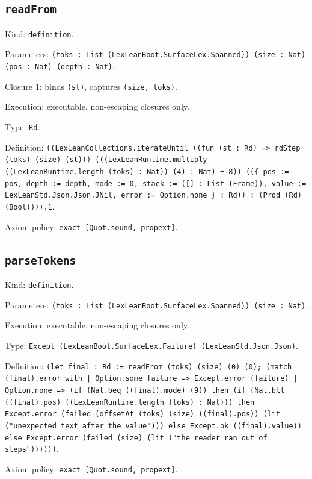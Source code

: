 \documentclass[11pt]{article}
\begin{document}
\subsection*{\texttt{readFrom}}
\noindent Kind: \texttt{definition}.\par
\noindent Parameters: \texttt{(toks : List (LexLeanBoot.SurfaceLex.Spanned)) (size : Nat) (pos : Nat) (depth : Nat)}.\par
\noindent Closure 1: binds \texttt{(st)}, captures \texttt{(size, toks)}.\par
\noindent Execution: executable, non-escaping closures only.\par
\noindent Type: \texttt{Rd}.\par
\noindent Definition: \texttt{((LexLeanCollections.iterateUntil ((fun (st : Rd) => rdStep (toks) (size) (st))) (((LexLeanRuntime.multiply ((LexLeanRuntime.length (toks) : Nat)) (4) : Nat) + 8)) ((\{ pos := pos, depth := depth, mode := 0, stack := ([] : List (Frame)), value := LexLeanStd.Json.Json.JNil, error := Option.none \} : Rd)) : (Prod (Rd) (Bool)))).1}.\par
\noindent Axiom policy: \texttt{exact [Quot.sound, propext]}.\par
\subsection*{\texttt{parseTokens}}
\noindent Kind: \texttt{definition}.\par
\noindent Parameters: \texttt{(toks : List (LexLeanBoot.SurfaceLex.Spanned)) (size : Nat)}.\par
\noindent Execution: executable, non-escaping closures only.\par
\noindent Type: \texttt{Except (LexLeanBoot.SurfaceLex.Failure) (LexLeanStd.Json.Json)}.\par
\noindent Definition: \texttt{(let final : Rd := readFrom (toks) (size) (0) (0); (match (final).error with | Option.some failure => Except.error (failure) | Option.none => (if (Nat.beq ((final).mode) (9)) then (if (Nat.blt ((final).pos) ((LexLeanRuntime.length (toks) : Nat))) then Except.error (failed (offsetAt (toks) (size) ((final).pos)) (lit ("unexpected text after the value"))) else Except.ok ((final).value)) else Except.error (failed (size) (lit ("the reader ran out of steps"))))))}.\par
\noindent Axiom policy: \texttt{exact [Quot.sound, propext]}.\par
\end{document}
